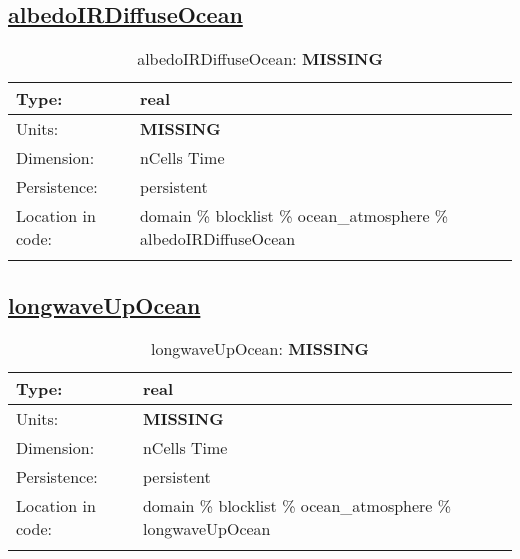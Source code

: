 \subsection[albedoIRDiffuseOcean]{\hyperref[sec:var_tab_ocean_atmosphere]{albedoIRDiffuseOcean}}
\label{subsec:var_sec_ocean_atmosphere_albedoIRDiffuseOcean}
\begin{center}
\begin{longtable}{| p{2.0in} | p{4.0in} |}
        \hline 
        Type: & real \\
        \hline 
        Units: & {\bf \color{red} MISSING} \\
        \hline 
        Dimension: & nCells Time \\
        \hline 
        Persistence: & persistent \\
        \hline 
         Location in code: & domain \% blocklist \% ocean\_atmosphere \% albedoIRDiffuseOcean \\
         \hline 
    \caption{albedoIRDiffuseOcean: {\bf \color{red} MISSING}}
\end{longtable}
\end{center}
\subsection[longwaveUpOcean]{\hyperref[sec:var_tab_ocean_atmosphere]{longwaveUpOcean}}
\label{subsec:var_sec_ocean_atmosphere_longwaveUpOcean}
\begin{center}
\begin{longtable}{| p{2.0in} | p{4.0in} |}
        \hline 
        Type: & real \\
        \hline 
        Units: & {\bf \color{red} MISSING} \\
        \hline 
        Dimension: & nCells Time \\
        \hline 
        Persistence: & persistent \\
        \hline 
         Location in code: & domain \% blocklist \% ocean\_atmosphere \% longwaveUpOcean \\
         \hline 
    \caption{longwaveUpOcean: {\bf \color{red} MISSING}}
\end{longtable}
\end{center}

